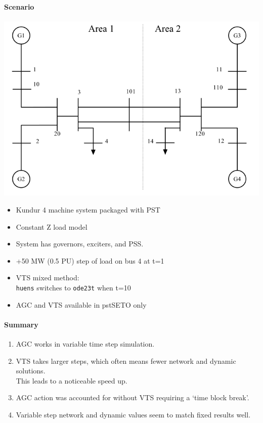 \documentclass[12pt]{article}
\begin{document}
\onehalfspacing
\paragraph{Scenario} \begin{center}
\begin{minipage}{.47\linewidth}
\includegraphics[width=\linewidth]{sysOneLineAreas}
\end{minipage} %
\begin{minipage}{.47\linewidth}
\begin{itemize}
\footnotesize
\itemsep 0em
\item Kundur  4 machine system packaged with PST
\item Constant Z load model
\item System has governors, exciters, and PSS.
\item +50 MW (0.5 PU) step of load on bus 4 at t=1
\item VTS mixed method:\\ \verb|huens| switches to \verb|ode23t| when t=10
\item AGC and VTS available in pstSETO only
\end{itemize}
\end{minipage}

\end{center}

\paragraph{Summary} 
\begin{enumerate}
\item AGC works in variable time step simulation.
\item VTS takes larger steps, which often means fewer network and dynamic solutions. \\
This leads to a noticeable speed up.
\item AGC action was accounted for without VTS requiring a `time block break'. 
\item Variable step network and dynamic values seem to match fixed results well.
\end{enumerate}
\end{document}
